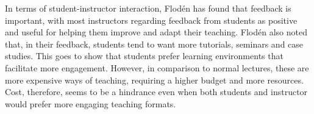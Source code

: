 In terms of student-instructor interaction, Flodén \cite{floden2017} has found that feedback is important, with most instructors regarding feedback from students as positive and useful for helping them improve and adapt their teaching. Flodén also noted that, in their feedback, students tend to want more tutorials, seminars and case studies. This goes to show that students prefer learning environments that facilitate more engagement. However, in comparison to normal lectures, these are more expensive ways of teaching, requiring a higher budget and more resources. Cost, therefore, seems to be a hindrance even when both students and instructor would prefer more engaging teaching formats.






